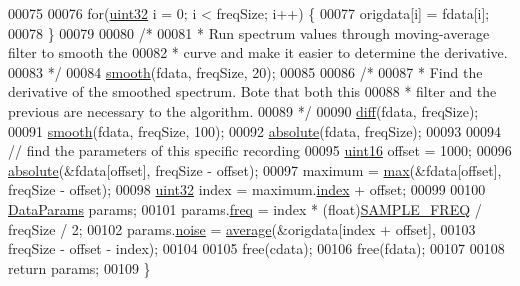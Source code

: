 \begin{DoxyCode}
00075 
00076         \textcolor{keywordflow}{for}(\hyperlink{definitions_8hpp_a1134b580f8da4de94ca6b1de4d37975e}{uint32} i = 0; i < freqSize; i++) \{
00077             origdata[i] = fdata[i];
00078         \}
00079 
00080         \textcolor{comment}{/*}
00081 \textcolor{comment}{         * Run spectrum values through moving-average filter to smooth the}
00082 \textcolor{comment}{         * curve and make it easier to determine the derivative.}
00083 \textcolor{comment}{         */}
00084         \hyperlink{namespaceavda_a22583ba7f11b69c955b13155bf9a739d}{smooth}(fdata, freqSize, 20);
00085 
00086         \textcolor{comment}{/*}
00087 \textcolor{comment}{         * Find the derivative of the smoothed spectrum. Bote that both this}
00088 \textcolor{comment}{         * filter and the previous are necessary to the algorithm.}
00089 \textcolor{comment}{         */}
00090         \hyperlink{namespaceavda_a3e9b92cfa9d76c4c363e8ed8a4c1a2ce}{diff}(fdata, freqSize);
00091         \hyperlink{namespaceavda_a22583ba7f11b69c955b13155bf9a739d}{smooth}(fdata, freqSize, 100);
00092         \hyperlink{namespaceavda_aa771d0ed99fc4954c643ea71e91905bf}{absolute}(fdata, freqSize);
00093 
00094         \textcolor{comment}{// find the parameters of this specific recording}
00095         \hyperlink{definitions_8hpp_a05f6b0ae8f6a6e135b0e290c25fe0e4e}{uint16} offset = 1000;
00096         \hyperlink{namespaceavda_aa771d0ed99fc4954c643ea71e91905bf}{absolute}(&fdata[offset], freqSize - offset);
00097         maximum = \hyperlink{namespaceavda_aa82021c3ee552773c060b1a39caf8aaa}{max}(&fdata[offset], freqSize - offset);
00098         \hyperlink{definitions_8hpp_a1134b580f8da4de94ca6b1de4d37975e}{uint32} index = maximum.\hyperlink{structMaximum_a2e6aef03795cd285fe542d0861c6e3b5}{index} + offset;
00099         
00100         \hyperlink{structDataParams}{DataParams} params;
00101         params.\hyperlink{structDataParams_a12566e017407647bc8287d62554ad3fb}{freq} = index * (float)\hyperlink{definitions_8hpp_a8ace559345ecba7978591ac2ef22aea4}{SAMPLE\_FREQ} / freqSize / 2;
00102         params.\hyperlink{structDataParams_a4efd1d2231c6fa7c878c9d5e1650738f}{noise} = \hyperlink{namespaceavda_a2a830f24a59aa2538ea82f6e000cce61}{average}(&origdata[index + offset],
00103                 freqSize - offset - index);
00104 
00105         free(cdata);
00106         free(fdata);
00107 
00108         \textcolor{keywordflow}{return} params;
00109     \}
\end{DoxyCode}


